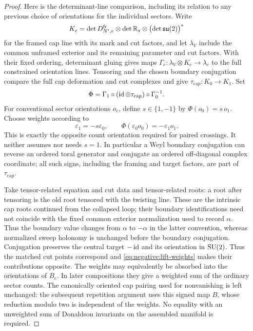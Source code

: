 \begin{proof}
Here is the determinant-line comparison, including its relation to any
previous choice of orientations for the individual sectors.  Write
\[
 K_e=\det D_{N',e}^{\mathrm{fr}}\otimes\det\mathbb R_s
          \otimes\bigl(\det\mathfrak{su}(2)\bigr)^*
\]
for the framed cap line with its mark and cut factors, and let
$\lambda_V$ include the common unframed exterior and its remaining
parameter and cut factors.  With their fixed ordering, determinant
gluing gives maps $\Gamma_e:\lambda_V\otimes K_e\longrightarrow
\lambda_e$ to the full constrained orientation lines.  Tensoring and
the chosen boundary conjugation compare the full cap deformation and
cut complexes and give $\tau_{\mathrm{cap}}:K_0\longrightarrow K_1$.
Set
\begin{equation}\label{eq:negative:orientation-comparison}
 \Phi=\Gamma_1\circ(\operatorname{id}\otimes\tau_{\mathrm{cap}})
                 \circ\Gamma_0^{-1}.
\end{equation}
For conventional sector orientations $o_e$, define $s\in\{1,-1\}$
by $\Phi(o_0)=s\,o_1$.  Choose weights according to
\begin{equation}\label{eq:negative:lift-weights}
 \varepsilon_1=-s\varepsilon_0,
 \qquad
 \Phi(\varepsilon_0o_0)=-\varepsilon_1o_1.
\end{equation}
This is exactly the opposite count orientation required for paired
crossings.  It neither assumes nor needs $s=1$.  In particular a Weyl
boundary conjugation can reverse an ordered toral generator and
conjugate an ordered off-diagonal complex coordinate; all such signs,
including the framing and target factors, are part of
$\tau_{\mathrm{cap}}$.

Take tensor-related equation and cut data and tensor-related roots:
a root after tensoring is the old root tensored with the twisting
line.  These are the intrinsic cap roots continued from the collapsed
loop; their boundary identifications need not coincide with the fixed
common exterior normalization used to record $\alpha$.  Thus the
boundary value changes from $\alpha$ to $-\alpha$ in the latter
convention, whereas normalized sweep holonomy is unchanged before the boundary
conjugation.  Conjugation preserves the central target $-\operatorname{id}$ and its
orientation in $\operatorname{SU}(2)$.  Thus the matched cut points correspond and
\eqref{eq:negative:lift-weights} makes their contributions opposite.
The weights may equivalently be absorbed into the orientations of
$B_e$.  In later compositions they give a weighted sum of the ordinary
sector counts.  The canonically oriented cap pairing used for
nonvanishing is left unchanged: the subsequent repetition argument
uses this signed map $B$, whose reduction modulo two is independent
of the weights.  No equality with an unweighted sum of Donaldson
invariants on the assembled manifold is required.


\end{proof}
